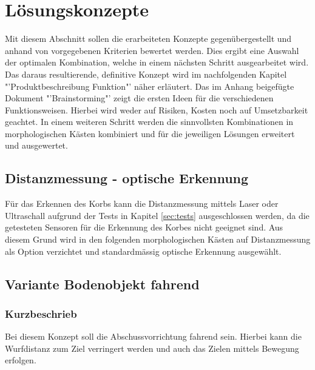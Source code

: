 \newcommand{\morphcellwidth}
{
0.10\linewidth
}
\section{Lösungskonzepte}
Mit diesem Abschnitt sollen die erarbeiteten Konzepte gegenübergestellt und 
anhand von vorgegebenen Kriterien bewertet werden. Dies ergibt eine 
Auswahl der optimalen Kombination, welche in einem nächsten Schritt 
ausgearbeitet wird. Das daraus resultierende, definitive Konzept wird im 
nachfolgenden Kapitel "'Produktbeschreibung Funktion"' näher erläutert. 
Das im Anhang beigefügte Dokument "'Brainstorming"' zeigt die ersten Ideen für 
die verschiedenen Funktionsweisen. Hierbei wird weder auf Risiken, Kosten 
noch auf Umsetzbarkeit geachtet. In einem weiteren Schritt werden die 
sinnvollsten Kombinationen in morphologischen Kästen kombiniert und für die 
jeweiligen Lösungen erweitert und ausgewertet. 

\subsection{Distanzmessung - optische Erkennung}
Für das Erkennen des Korbs kann die Distanzmessung mittels Laser oder Ultraschall 
aufgrund der Tests in Kapitel \ref{sec:tests} ausgeschlossen werden, da die 
getesteten Sensoren für die Erkennung des Korbes nicht geeignet sind. 
Aus diesem Grund wird in den folgenden morphologischen Kästen auf 
Distanzmessung als Option verzichtet und standardmässig 
optische Erkennung ausgewählt.

\subsection{Variante Bodenobjekt fahrend}
\subsubsection{Kurzbeschrieb}
Bei diesem Konzept soll die Abschussvorrichtung fahrend sein. Hierbei kann 
die  Wurfdistanz zum Ziel verringert werden und auch das Zielen mittels 
Bewegung erfolgen.

